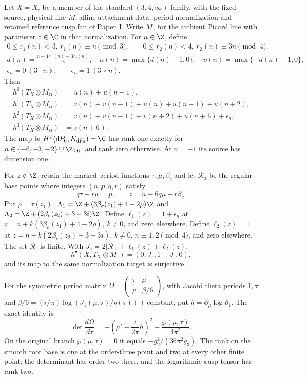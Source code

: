 \hypertarget{main-II-E}{}
\begin{maintheorem}
\hypertarget{tag-03K6}{}\label{series:II:E}

Let $X=X_c$ be a member of the standard $(3,4,\infty)$ family,
with the fixed source, physical line $M$, affine attachment data,
period normalization and retained reference cusp fan of Paper~I.
Write $M_z$ for the ambient Picard line with parameter $z\in\C$
in that normalization. For $n\in\Z$, define
\[
 \begin{gathered}
 0\le r_1(n)<3,\ r_1(n)\equiv n\pmod3,\qquad
 0\le r_2(n)<4,\ r_2(n)\equiv3n\pmod4,\\
 d(n)=\frac{n-4r_1(n)-3r_2(n)}{12},\quad
 u(n)=\max\{d(n)+1,0\},\quad v(n)=\max\{-d(n)-1,0\},\\
 \epsilon_n=0\ (3\mid n),\qquad \epsilon_n=1\ (3\nmid n).
 \end{gathered}
\]
Then
\[
\begin{aligned}
 h^0(T_X\otimes M_n)&=u(n)+u(n-1),\\
 h^1(T_X\otimes M_n)&=v(n)+v(n-1)+u(n)+u(n-1)+u(n+2),\\
 h^2(T_X\otimes M_n)&=v(n)+v(n-1)+v(n+2)+u(n+6)+\epsilon_n,\\
 h^3(T_X\otimes M_n)&=v(n+6).
\end{aligned}
\]
The map to $H^2(\mathrm dP_6,K_{\mathrm dP_6})=\C$ has rank one
exactly for $n\in\{-6,-3,-2\}\cup\Z_{\ge0}$, and rank zero
otherwise. At $n=-1$ its source has dimension one.

For $z\notin\Z$, retain the marked period functions
$\tau,\mu,\beta_c$ and let $\mathcal R_z$ be the regular base
points where integers $(n,p,q,r)$ satisfy
\[
 q\tau+r\mu=p,\qquad z=n-6q\mu-r\beta_c.
\]
Put $\rho=\tau(z_1)$,
$\Lambda_1=\Z+(3\beta_c(z_1)+4-2\rho)\Z$ and
$\Lambda_2=\Z+(2\beta_c(z_2)+3-3i)\Z$.
Define $\ell_1(z)=1+\epsilon_n$ at
$z=n+k(3\beta_c(z_1)+4-2\rho)$, $k\ne0$, and zero elsewhere.
Define $\ell_2(z)=1$ at
$z=n+k(2\beta_c(z_2)+3-3i)$, $k\ne0$,
$n\equiv1,2\pmod4$, and zero elsewhere. The set $\mathcal R_z$
is finite. With $J_z=2|\mathcal R_z|+\ell_1(z)+\ell_2(z)$,
\[
 h^\bullet(X,T_X\otimes M_z)=(0,J_z,1+J_z,0),
\]
and its map to the same normalization target is surjective.

For the symmetric period matrix
$\Omega=\left(\begin{smallmatrix}\tau&\mu\\\mu&\beta/6\end{smallmatrix}\right)$,
with Jacobi theta periods $1,\tau$ and
$\beta/6=(i/\pi)\log(\vartheta_1(\mu,\tau)/\eta(\tau))+\mathrm{constant}$,
put $h=\partial_\mu\log\vartheta_1$. The exact identity is
\[
 \det\frac{d\Omega}{d\tau}
 =-\left(\mu'-\frac{i}{2\pi}h\right)^2
   -\frac{\wp(\mu,\tau)}{4\pi^2}.
\]
On the original branch $\wp(\mu,\tau)=0$ it equals
$-g_2^2/(36\pi^2g_3)$. The rank on the smooth root base is one
at the order-three point and two at every other finite point;
the determinant has order two there, and the logarithmic cusp
tensor has rank two.

\end{maintheorem}

